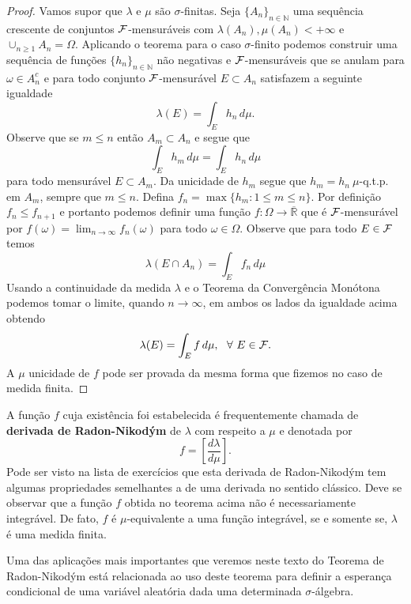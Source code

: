 \begin{proof}
Vamos supor que $\lambda$ e $\mu$ são 
$\sigma$-finitas. Seja $\{A_n\}_{n\in\mathbb{N}}$
uma sequência crescente de conjuntos $\mathcal{F}$-mensuráveis com
$\lambda(A_n),\mu(A_n)<+\infty$ e 
$\cup_{n\geq 1}A_n =\Omega$.
Aplicando o teorema para o caso $\sigma$-finito
podemos construir uma sequência de funções 
$\{h_n\}_{n\in\mathbb{N}}$ não negativas e 
$\mathcal{F}$-mensuráveis que se anulam 
para $\omega\in A^c_n$ e para todo 
conjunto $\mathcal{F}$-mensurável $E\subset A_n$
satisfazem a seguinte igualdade
\[
\lambda(E) = \int_E h_n\, d\mu.
\]
Observe que se $m\leq n$ então $A_m\subset A_n$
e segue que 
\[
\int_E h_m\, d\mu
=
\int_E h_n\, d\mu
\]
para todo mensurável $E\subset A_m$.
Da unicidade de $h_m$ segue que 
$h_m=h_n\ \mu$-q.t.p. em $A_m$, 
sempre que $m\leq n$.
Defina $f_n=\max\{h_m: 1\leq m\leq n\}$.
Por definição $f_n\leq f_{n+1}$ e portanto 
podemos definir uma função $f:\Omega\to\overline{\mathbb{R}}$ 
que é $\mathcal{F}$-mensurável 
por $f(\omega) =\lim_{n\to\infty} f_n(\omega)$
para todo $\omega\in\Omega$. Observe que
para todo $E\in\mathcal{F}$ temos 
\[
\lambda(E\cap A_n) = \int_{E} f_n\, d\mu
\]
Usando a continuidade da medida $\lambda$
e o Teorema da Convergência Monótona 
podemos tomar o limite, quando $n\to\infty$,
em ambos os lados da igualdade acima obtendo
\[
\lambda(E) = \int_{E} f\, d\mu,
\ \ \forall \ E\in\mathcal{F}.
\]
A $\mu$ unicidade de $f$ pode ser provada da mesma
forma que fizemos no caso de medida finita.
\end{proof}


A função $f$ cuja existência foi estabelecida é 
frequentemente chamada de {\bf derivada de Radon-Nikodým}
de $\lambda$ com respeito a $\mu$ e denotada por
\[
f = \left[\frac{d\lambda}{d\mu}\right].
\]
Pode ser visto na lista de exercícios que esta
derivada de Radon-Nikodým tem algumas propriedades
semelhantes a de uma derivada no sentido clássico.
Deve se observar que a função $f$ obtida no 
teorema acima não é necessariamente integrável.
De fato, $f$ é $\mu$-equivalente a uma função 
integrável, se e somente se, $\lambda$ é uma 
medida finita.

Uma das aplicações mais importantes que veremos 
neste texto do Teorema de Radon-Nikodým está 
relacionada ao uso deste teorema para definir a esperança
condicional de uma variável aleatória dada uma 
determinada $\sigma$-álgebra.